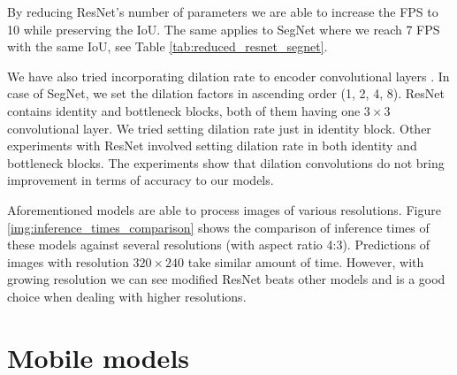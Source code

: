 By reducing ResNet's number of parameters we are able to increase the FPS to 10
while preserving the IoU. The same applies to SegNet where we reach 7 FPS
with the same IoU, see Table \ref{tab:reduced_resnet_segnet}.

We have also tried incorporating dilation rate to
encoder convolutional layers \cite{bib:yu2015multi}. In case of SegNet, we set
the dilation factors in ascending order (1, 2, 4, 8). ResNet contains identity
and bottleneck blocks, both of them having one $3\times 3$ convolutional layer. We 
tried setting dilation rate just in identity block. Other experiments with ResNet
involved setting dilation rate in both identity and bottleneck blocks.
The experiments show that dilation convolutions do not bring improvement in terms of
accuracy to our models.

Aforementioned models are able to process images of various resolutions. Figure
\ref{img:inference_times_comparison} shows the comparison of inference times of
these models against several resolutions (with aspect ratio 4:3). Predictions
of images with resolution $320\times 240$ take similar amount of time. However, with
growing resolution we can see modified ResNet beats other models and is a good choice
when dealing with higher resolutions.


\section{Mobile models}
\label{sec:mobile_models}


